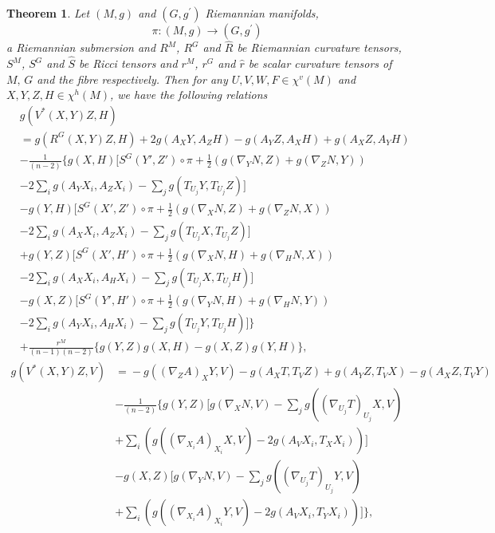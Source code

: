\documentclass{birkjour}
\newtheorem{theorem}{Theorem}[section]
\theoremstyle{definition}
\theoremstyle{remark}
\numberwithin{equation}{section}
\begin{document}
\begin{theorem}
	Let $(M, g)$ and $(G, g^\prime)$ Riemannian manifolds,
	$$\pi: (M, g) \to(G, g^\prime)$$
	a Riemannian submersion and $R^M$, $R^G$ and $\hat{R}$ be Riemannian curvature tensors, $S^M$, $S^G$ and $\hat{S}$ be Ricci tensors and $r^M$, $r^G$ and $\hat{r}$ be scalar curvature tensors of $M, \, G$ and the fibre respectively. Then for any $U, V, W, F \in \chi^v (M)$ and $X, Y, Z, H\in  \chi^h (M)$, we have the following relations
	\begin{align*}
		&g(V^* (X,Y)Z, H) \\
		&= g(R^G (X,Y)Z, H) +2 g (A_X Y, A_Z H) - g(A_Y Z, A_X H) + g(A_X Z, A_Y H) \\
		&- \frac{1}{(n-2)} \Bigg\{g(X, H) \bigg[S^G (Y',Z') \circ \pi
		+\frac{1}{2} \left(g(\nabla_Y N,Z)+g(\nabla_Z N, Y)\right) \\
		&- 2 \sum_{i} g(A_Y X_i, A_Z X_i) - \sum_{j} g(T_{U_j}Y, T_{U_j}Z) \Bigg] \\
		&-g(Y,H) \bigg[S^G (X',Z') \circ \pi + \frac{1}{2} \left(g(\nabla_X N,Z)+ g(\nabla_Z N, X)\right) \\
		&-2 \sum_{i} g(A_X X_i, A_Z X_i)- \sum_{j}g(T_{U_j}X, T_{U_j}Z)  \bigg] \\
		&+g(Y,Z) \bigg[S^G (X',H') \circ \pi + \frac{1}{2} \left(g(\nabla_X N,H)+ g(\nabla_H N, X)\right)  \\
		&-2 \sum_{i} g(A_X X_i, A_H X_i)- \sum_{j}g(T_{U_j}X, T_{U_j}H)  \bigg] \\
		&-g(X,Z) \bigg[S^G (Y',H') \circ \pi + \frac{1}{2} \left(g(\nabla_Y N,H)+ g(\nabla_H N, Y)\right) \\
		&-2 \sum_{i} g(A_Y X_i, A_H X_i)- \sum_{j}g(T_{U_j}Y, T_{U_j}H)  \bigg]\Bigg\} \\
		&+ \frac{r^M}{(n-1)(n-2)} \{g(Y,Z) g(X,H)- g(X,Z)g(Y,H)\},
	\end{align*}
	\begin{align*}
		g(V^* (X,Y)Z, V) &\!=\! -g((\nabla_Z A)_X Y,V)\!\!-\!\! g(A_X T, T_V Z)\!+\!g(A_Y Z, T_V X)\!-\!g(A_X Z, T_V Y) \\
		&- \frac{1}{(n-2)} \Bigg\{g(Y, Z) \bigg[g(\nabla_X N,V)
		-\sum_{j} g((\nabla_{U_j} T)_{U_j} X, V) \\
		&+\sum_{i}\left(g((\nabla_{X_i}A)_{X_i} X,V )- 2 g (A_V X_i, T_X X_i) \right) \bigg] \\
		&  -g(X,Z) \bigg[g(\nabla_Y N,V)
		-\sum_{j} g((\nabla_{U_j} T)_{U_j} Y, V) \\
		&+ \sum_{i}\left(g((\nabla_{X_i}A)_{X_i} Y,V  ) - 2 g (A_V X_i, T_Y X_i) \right) \bigg] \Bigg\},

\end{align*}
\end{theorem}
\end{document}
